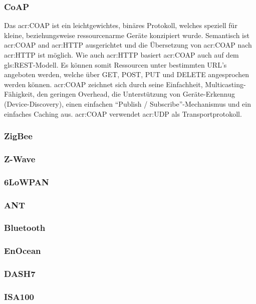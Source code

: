 \subsubsection{CoAP}
Das \gls{acr:COAP} ist ein leichtgewichtes, binäres Protokoll, welches speziell für kleine, beziehungsweise ressourcenarme  Geräte konzipiert wurde. Semantisch ist \gls{acr:COAP} and \gls{acr:HTTP} ausgerichtet und die Übersetzung von \gls{acr:COAP} nach \gls{acr:HTTP} ist möglich. Wie auch \gls{acr:HTTP} basiert \gls{acr:COAP} auch auf dem \gls{gls:REST}-Modell. Es können somit Ressourcen unter bestimmten URL's angeboten werden, welche über GET, POST, PUT und DELETE angesprochen werden können. \gls{acr:COAP} zeichnet sich durch seine Einfachheit, Multicasting-Fähigkeit, den geringen Overhead, die Unterstützung von Geräte-Erkennug (Device-Discovery), einen einfachen "`Publish / Subscribe"'-Mechanismus und ein einfaches Caching aus. \gls{acr:COAP} verwendet \gls{acr:UDP} als Transportprotokoll.


\subsubsection{ZigBee}

\subsubsection{Z-Wave}

\subsubsection{6LoWPAN}

\subsubsection{ANT}

\subsubsection{Bluetooth}

\subsubsection{EnOcean}

\subsubsection{DASH7}

\subsubsection{ISA100}

